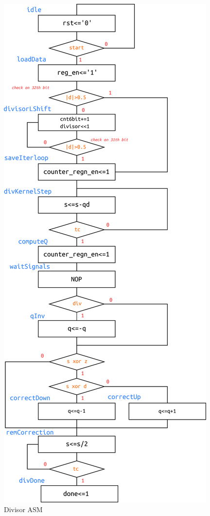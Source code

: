 \begin{figure}[H]
\centering
\includegraphics[scale=1]{pics/divisorASM.png}
    \caption{Divisor ASM}
    \label{fig:my_label}
\end{figure}
